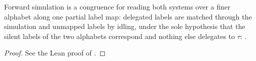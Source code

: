 \begin{theorem}
  \label{thm:mapidle-cong}
  \leanok
  Forward simulation is a congruence for reading both systems over a finer alphabet along one partial label map: delegated labels are matched through the simulation and unmapped labels by idling, under the sole hypothesis that the silent labels of the two alphabets correspond and nothing else delegates to $\tau$: .
\end{theorem}

\begin{proof}\leanok
  See the Lean proof of .
\end{proof}
